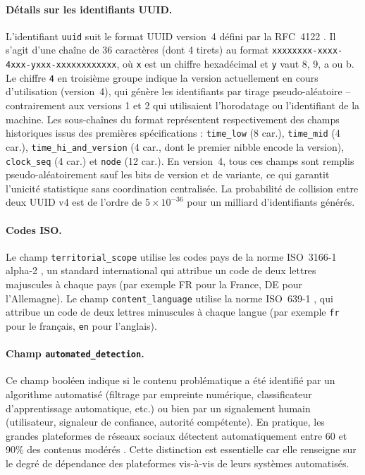 \documentclass[10pt,twocolumn,a4paper]{article}
\begin{document}
\paragraph{Détails sur les identifiants UUID.} L'identifiant \texttt{uuid} suit le format UUID version~4 défini par la RFC~4122 \cite{rfc4122}. Il s'agit d'une chaîne de 36 caractères (dont 4 tirets) au format \texttt{xxxxxxxx-xxxx-4xxx-yxxx-xxxxxxxxxxxx}, où \texttt{x} est un chiffre hexadécimal et \texttt{y} vaut 8, 9, a ou b. Le chiffre \texttt{4} en troisième groupe indique la version actuellement en cours d'utilisation (version~4), qui génère les identifiants par tirage pseudo-aléatoire -- contrairement aux versions 1 et 2 qui utilisaient l'horodatage ou l'identifiant de la machine. Les sous-chaînes du format représentent respectivement des champs historiques issus des premières spécifications : \texttt{time\_low} (8 car.), \texttt{time\_mid} (4 car.), \texttt{time\_hi\_and\_version} (4 car., dont le premier nibble encode la version), \texttt{clock\_seq} (4 car.) et \texttt{node} (12 car.). En version~4, tous ces champs sont remplis pseudo-aléatoirement sauf les bits de version et de variante, ce qui garantit l'unicité statistique sans coordination centralisée. La probabilité de collision entre deux UUID v4 est de l'ordre de $5 \times 10^{-36}$ pour un milliard d'identifiants générés.

\paragraph{Codes ISO.} Le champ \texttt{territorial\_scope} utilise les codes pays de la norme ISO~3166-1 alpha-2 \cite{iso3166}, un standard international qui attribue un code de deux lettres majuscules à chaque pays (par exemple FR pour la France, DE pour l'Allemagne). Le champ \texttt{content\_language} utilise la norme ISO~639-1 \cite{iso639}, qui attribue un code de deux lettres minuscules à chaque langue (par exemple \texttt{fr} pour le français, \texttt{en} pour l'anglais).

\paragraph{Champ \texttt{automated\_detection}.} Ce champ booléen indique si le contenu problématique a été identifié par un algorithme automatisé (filtrage par empreinte numérique, classificateur d'apprentissage automatique, etc.) ou bien par un signalement humain (utilisateur, signaleur de confiance, autorité compétente). En pratique, les grandes plateformes de réseaux sociaux détectent automatiquement entre 60 et 90\% des contenus modérés \cite{dsadb}. Cette distinction est essentielle car elle renseigne sur le degré de dépendance des plateformes vis-à-vis de leurs systèmes automatisés.
\end{document}
